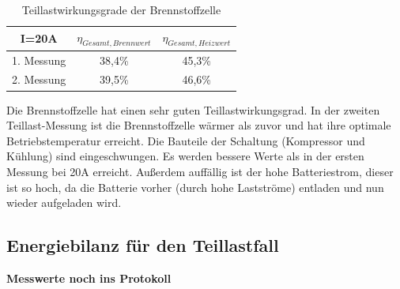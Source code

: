 \begin{table}[H]
    \caption{Teillastwirkungsgrade der Brennstoffzelle}
    \centering
        \begin{tabular}[pos]{|c|c|c|}
            \hline
            \rowcolor[HTML]{70AD47} 
            I=20A   & $\eta_{Gesamt,Brennwert}$               & $\eta_{Gesamt,Heizwert}$   \\\hline\hline
            1. Messung  & 38,4\%                            & 45,3\%                            \\
            2. Messung  & 39,5\%                            & 46,6\%                            \\\hline
        \end{tabular}
        \label{tab:20230628_Teillastwirkungsgrade}
\end{table}


Die Brennstoffzelle hat einen sehr guten Teillastwirkungsgrad. In der zweiten Teillast-Messung ist die Brennstoffzelle wärmer als zuvor und hat ihre optimale Betriebstemperatur erreicht. Die Bauteile der Schaltung (Kompressor und Kühlung) sind eingeschwungen. Es werden bessere Werte als in der ersten Messung bei 20A erreicht. Außerdem auffällig ist der hohe Batteriestrom, dieser ist so hoch, da die Batterie vorher (durch hohe Lastströme) entladen und nun wieder aufgeladen wird. 



\subsection{Energiebilanz für den Teillastfall}

\textbf{Messwerte noch ins Protokoll}